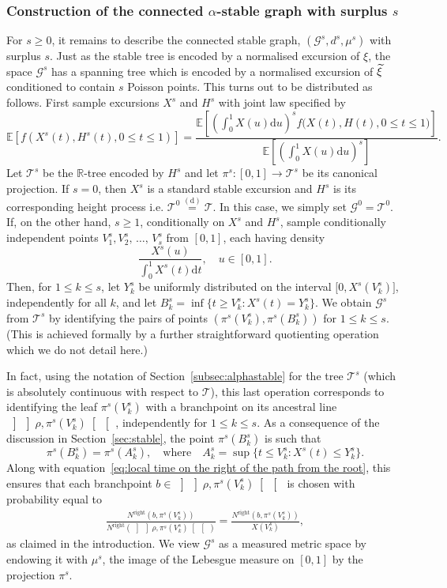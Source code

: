 \documentclass[AHL,Unicode,longabstracts,published]{cedram}
\newcommand{\intervalle}[4]{\mathopen{#1}#2
\mathclose{}\mathpunct{},#3
\mathclose{#4}}
\newcommand{\intervalleff}[2]{\intervalle{[}{#1}{#2}{]}}
\newcommand{\E}[1]{\ensuremath{\mathbb{E} \left[#1 \right]}}
\newcommand{\equidist}{\ensuremath{\stackrel{\mathrm{(d)}}{=}}}
\newcommand{\oseg}[2]{\, \left] \! \left] #1, #2 \right[\! \right[\,}
\newcommand{\Rightll}{\mathrm{right}}
\newcommand{\rmd}{\mathrm{d}}
\newcommand{\cG}{\mathcal{G}}
\newcommand{\cT}{\mathcal{T}}
\newcommand{\R}{\mathbb{R}}
\let\oldtilde\tilde
\renewcommand*{\tilde}[1]{\mathchoice{\widetilde{#1}}{\widetilde{#1}}{\oldtilde{#1}}{\oldtilde{#1}}}
\newcommand{\R}{\mathbb{R}}
\begin{document}
\subsubsection{Construction of the connected $\alpha$-stable graph with surplus $s$}
For $s \ge 0$, it remains to describe the connected stable graph, $(\cG^s, d^s, \mu^s)$ with surplus $s$. Just as the stable tree is encoded by a normalised excursion of $\xi$, the space $\cG^s$ has a spanning tree which is encoded by a normalised excursion of $\tilde{\xi}$ conditioned to contain $s$ Poisson points. This turns out to be distributed as follows. First sample excursions $X^s$ and $H^s$ with joint law specified by
\[
\E{f\left(X^s(t), H^s(t), 0 \le t \le 1\right)} = \frac{\E{\left(\int_0^{1} X(u) \rmd u \right)^s f\big(X(t), H(t), 0 \le t \le 1\big)}}{\E{\left(\int_0^{1} X(u) \rmd u \right)^s}}.
\]
Let $\cT^s$ be the $\R$-tree encoded by $H^s$ and let $\pi^s: [0,1] \to \cT^s$ be its canonical projection. If $s = 0$, then $X^s$ is a standard stable excursion and $H^s$ is its corresponding height process i.e. $\cT^0 \equidist \cT$. In this case, we simply set $\cG^0 = \cT^0$. If, on the other hand, $s \ge 1$, conditionally on $X^s$ and $H^s$, sample conditionally independent points $V^s_1, V^s_2, \,\ldots,\,V^s_s$ from $[0,1]$, each having density
\[
\frac{X^s(u)}{\int_0^1 X^s(t) \rmd t}, \quad u \in [0,1].
\]
Then, for $1 \le k \le s$, let $Y^s_{k}$ be uniformly distributed on the interval $\intervalleff{0}{X^s(V^s_k)}$, independently for all $k$, and let $B^s_{k} = \inf \{t \ge V^s_{k}: X^s(t) = Y^s_{k} \}$. We obtain $\cG^s$ from $\cT^s$ by identifying the pairs of points $(\pi^s(V^s_k), \pi^s(B^s_k))$ for $1 \le k \le s$. (This is achieved formally by a further straightforward quotienting operation which we do not detail here.)

In fact, using the notation of Section~\ref{subsec:alphastable} for the tree $\cT^s$ (which is absolutely continuous with respect to $\cT$), this last operation corresponds to identifying the leaf $\pi^s(V^s_k)$ with a branchpoint on its ancestral line $\oseg{\rho}{\pi^s(V^s_k)}$, independently for $1\leq k \leq s$. As a consequence of the discussion in Section~\ref{sec:stable}, the point $\pi^s(B_k^s)$ is such that
\[
\pi^s\left(B^s_k\right)=\pi^s\left(A^s_k\right), \quad \text{where} \quad A^s_{k} = \sup \Big\{t \le V^s_{k}: X^s(t) \leq Y_k^s \Big\}.
\]
Along with equation~\eqref{eq:local time on the right of the path from the root}, this ensures that each branchpoint $b\in \oseg{\rho}{\pi^s(V^s_k)}$ is chosen with probability equal to
\begin{align*}
\frac{N^{\Rightll}\left(b,\pi^s\left(V^s_k\right)\right)}{N^{\Rightll}\left(\oseg{\rho}{\pi^s\left(V^s_k\right)}\right)}= \frac{N^{\Rightll}\left(b,\pi^s\left(V^s_k\right)\right)}{X\left(V^s_k\right)},
\end{align*}
as claimed in the introduction. We view $\cG^s$ as a measured metric space by endowing it with $\mu^s$, the image of the Lebesgue measure on $[0,1]$ by the projection $\pi^s$.
\end{document}
